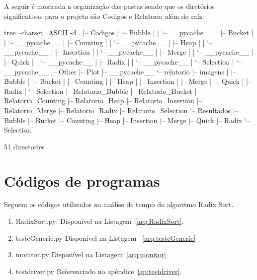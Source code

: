 \documentclass[12pt,a4paper,twoside]{report}
\begin{document}
A seguir é mostrada a organização das pastas sendo que os diretórios significativas para o projeto são Codigos e Relatorio além do raíz:
\begin{terminal}

  tree --charset=ASCII -d
  .
  |-- Codigos
  |   |-- Bubble
  |   |   `-- __pycache__
  |   |-- Bucket
  |   |   `-- __pycache__
  |   |-- Counting
  |   |   `-- __pycache__
  |   |-- Heap
  |   |   `-- __pycache__
  |   |-- Insertion
  |   |   `-- __pycache__
  |   |-- Merge
  |   |   `-- __pycache__
  |   |-- Quick
  |   |   `-- __pycache__
  |   |-- Radix
  |   |   `-- __pycache__
  |   `-- Selection
  |       `-- __pycache__
  |-- Other
  |-- Plot
  |-- __pycache__
  `-- relatorio
      |-- imagens
      |   |-- Bubble
      |   |-- Bucket
      |   |-- Counting
      |   |-- Heap
      |   |-- Insertion
      |   |-- Merge
      |   |-- Quick
      |   |-- Radix
      |   `-- Selection
      |-- Relatorio_Bubble
      |-- Relatorio_Bucket
      |-- Relatorio_Counting
      |-- Relatorio_Heap
      |-- Relatorio_Insertion
      |-- Relatorio_Merge
      |-- Relatorio_Radix
      |-- Relatorio_Selection
      `-- Resultados
          |-- Bubble
          |-- Bucket
          |-- Counting
          |-- Heap
          |-- Insertion
          |-- Merge
          |-- Quick
          |-- Radix
          `-- Selection

  51 directories

\end{terminal}

\section{Códigos de programas}
Seguem os códigos utilizados na análise de tempo do algoritmo Radix Sort.
\begin{enumerate}

\item RadixSort.py:
Disponível na Listagem~\ref{arq:RadixSort}.


\item testeGeneric.py
Disponível na Listagem ~\ref{arq:testeGeneric}


\item monitor.py
Disponível na Listagem~\ref{arq:monitor}



\item testdriver.py
 Referenciado no apêndice~\ref{ap:testdriver}.
\end{enumerate}
\end{document}

